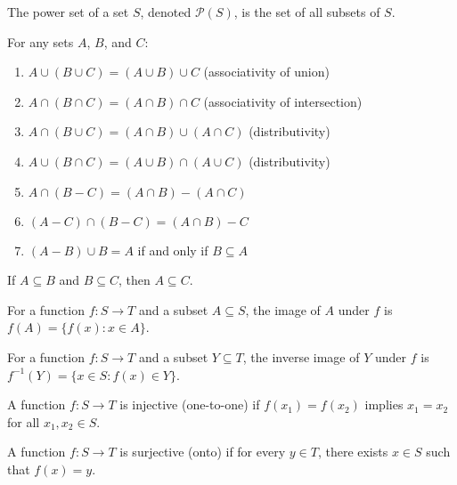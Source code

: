 \begin{definition}
The power set of a set $S$, denoted $\mathcal{P}(S)$, is the set of all subsets of $S$.
\end{definition}

\begin{theorem}
For any sets $A$, $B$, and $C$:
\begin{enumerate}
\item $A \cup (B \cup C) = (A \cup B) \cup C$ (associativity of union)
\item $A \cap (B \cap C) = (A \cap B) \cap C$ (associativity of intersection)
\item $A \cap (B \cup C) = (A \cap B) \cup (A \cap C)$ (distributivity)
\item $A \cup (B \cap C) = (A \cup B) \cap (A \cup C)$ (distributivity)
\item $A \cap (B - C) = (A \cap B) - (A \cap C)$
\item $(A - C) \cap (B - C) = (A \cap B) - C$
\item $(A - B) \cup B = A$ if and only if $B \subseteq A$
\end{enumerate}
\end{theorem}

\begin{theorem}
If $A \subseteq B$ and $B \subseteq C$, then $A \subseteq C$.
\end{theorem}

\begin{definition}[Image]
For a function $f: S \to T$ and a subset $A \subseteq S$, the image of $A$ under $f$ is $f(A) = \{f(x) : x \in A\}$.
\end{definition}

\begin{definition}
For a function $f: S \to T$ and a subset $Y \subseteq T$, the inverse image of $Y$ under $f$ is $f^{-1}(Y) = \{x \in S : f(x) \in Y\}$.
\end{definition}

\begin{definition}
A function $f: S \to T$ is injective (one-to-one) if $f(x_1) = f(x_2)$ implies $x_1 = x_2$ for all $x_1, x_2 \in S$.
\end{definition}

\begin{definition}
A function $f: S \to T$ is surjective (onto) if for every $y \in T$, there exists $x \in S$ such that $f(x) = y$.
\end{definition}

